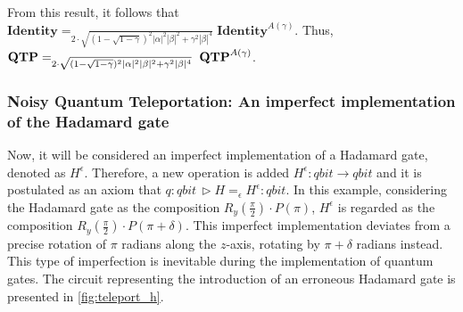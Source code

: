 From this result, it follows that $\textbf{Identity} =_{ 2 \cdot \sqrt{  (1-\sqrt{1-\gamma})^{2} |\alpha|^{2}|\beta|^{2}+ \gamma^{2} |\beta|^{4}}} \textbf{Identity}^{A(\gamma)}$. Thus, $ \\ \textbf{QTP} =_{2 \cdot \sqrt{  (1-\sqrt{1-\gamma})^{2} |\alpha|^{2}|\beta|^{2} + \gamma^{2} |\beta|^{4}}} \hspace{3pt}\textbf{QTP}^{A(\gamma)}$.

\subsubsection{Noisy Quantum Teleportation: An imperfect implementation of the Hadamard gate}

Now, it will be considered an imperfect implementation of a Hadamard gate, denoted as $H^{\epsilon}$. Therefore, a new operation is added $H^{\epsilon}: \textit{qbit} \xrightarrow{} \textit{qbit}$ and it is postulated as an axiom that $q:\textit{qbit} \hspace{2pt} \triangleright H =_{\epsilon} H^{\epsilon}:\textit{qbit}$.
 In this example, considering the Hadamard gate as the composition $R_y(\frac{\pi}{2}) \cdot P(\pi)$, $H^{\epsilon}$ is regarded as the composition $R_y(\frac{\pi}{2}) \cdot P(\pi+\delta)$. This imperfect implementation deviates from a precise rotation of $\pi$ radians along the $z$-axis,  rotating by $\pi+\delta$ radians instead.  This type of imperfection is inevitable during the implementation of quantum gates. The circuit representing the introduction of an erroneous Hadamard gate is presented in \autoref{fig:teleport_h}.

